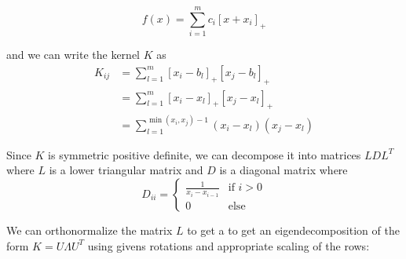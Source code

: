 \begin{equation}
    f(x) = \sum_{i=1}^m c_i [x + x_i]_+
\end{equation}

and we can write the kernel $K$ as
\begin{align}
    K_{ij} &= \sum_{l=1}^m [x_i - b_l]_+ [x_j - b_l]_+\\
           &= \sum_{l=1}^m [x_i - x_l]_+ [x_j - x_l]_+\\
           &= \sum_{l = 1}^{\min(x_i, x_j)-1} (x_i - x_l) (x_j - x_l)
\end{align}

Since $K$ is symmetric positive definite, we can decompose it into matrices $LDL^T$ where $L$ is a lower triangular matrix and $D$ is a diagonal matrix where 
\begin{equation*}
    D_{ii} = \begin{cases}\frac{1}{x_i - x_{i-1}}& \text{if } i > 0\\0 & \text{else}\end{cases}
\end{equation*}

We can orthonormalize the matrix $L$ to get a to get an eigendecomposition of the form $K = U \Lambda U^T$ using givens rotations and appropriate scaling of the rows:

